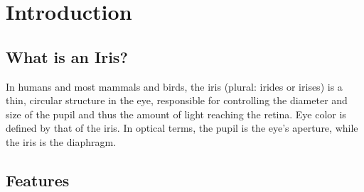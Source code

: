 \chapter{Introduction}
\section{What is an Iris?}
In humans and most mammals and birds, the iris (plural: irides or irises) is a thin, circular structure in the eye, responsible for controlling the diameter and size of the pupil and thus the amount of light reaching the retina. Eye color is defined by that of the iris. In optical terms, the pupil is the eye's aperture, while the iris is the diaphragm.
\section{Features}